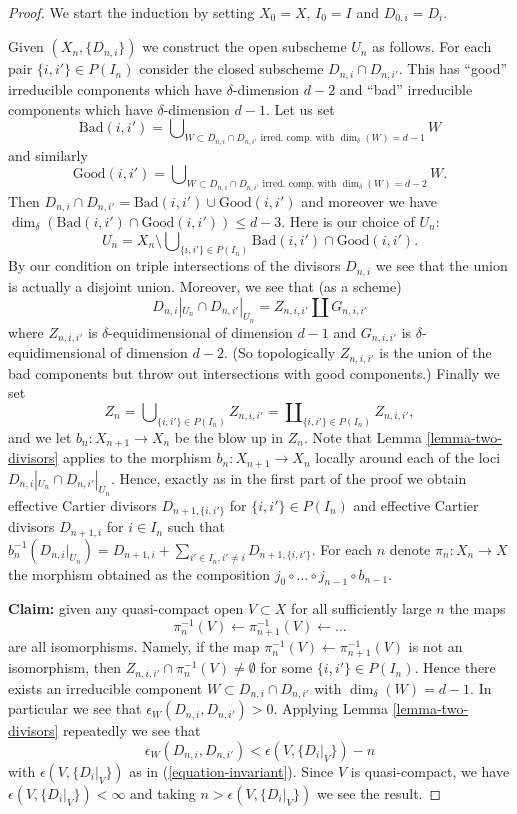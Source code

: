 \begin{proof}
\medskip\noindent
We start the induction by setting $X_0 = X$,
$I_0 = I$ and $D_{0, i} = D_i$.

\medskip\noindent
Given $(X_n, \{D_{n, i}\})$ we construct the open subscheme
$U_n$ as follows. For each pair $\{i, i'\} \in P(I_n)$ consider
the closed subscheme $D_{n, i} \cap D_{n, i'}$. This has ``good''
irreducible components which have $\delta$-dimension $d - 2$ and
``bad'' irreducible components which have $\delta$-dimension $d - 1$.
Let us set
$$
\text{Bad}(i, i')
=
\bigcup\nolimits_{W \subset D_{n, i} \cap D_{n, i'}
\text{ irred.\ comp. with }\dim_\delta(W) = d - 1} W
$$
and similarly
$$
\text{Good}(i, i')
=
\bigcup\nolimits_{W \subset D_{n, i} \cap D_{n, i'}
\text{ irred.\ comp. with }\dim_\delta(W) = d - 2} W.
$$
Then $D_{n, i} \cap D_{n, i'} = \text{Bad}(i, i') \cup \text{Good}(i, i')$
and moreover we have
$\dim_\delta(\text{Bad}(i, i') \cap \text{Good}(i, i')) \leq d - 3$.
Here is our choice of $U_n$:
$$
U_n
=
X_n
\setminus
\bigcup\nolimits_{\{i, i'\} \in P(I_n)}
\text{Bad}(i, i') \cap \text{Good}(i, i').
$$
By our condition on triple intersections of the divisors $D_{n, i}$
we see that the union is actually a disjoint union. Moreover,
we see that (as a scheme)
$$
D_{n, i}|_{U_n} \cap D_{n, i'}|_{U_n}
=
Z_{n, i, i'} \amalg G_{n, i, i'}
$$
where $Z_{n, i, i'}$ is $\delta$-equidimensional of dimension $d - 1$
and $G_{n, i, i'}$ is $\delta$-equidimensional of dimension $d - 2$.
(So topologically $Z_{n, i, i'}$ is the union of the bad components
but throw out intersections with good components.) Finally we set
$$
Z_n =
\bigcup\nolimits_{\{i, i'\} \in P(I_n)} Z_{n, i, i'} =
\coprod\nolimits_{\{i, i'\} \in P(I_n)} Z_{n, i, i'},
$$
and we let $b_n : X_{n + 1} \to X_n$ be the blow up in $Z_n$.
Note that Lemma \ref{lemma-two-divisors}
applies to the morphism $b_n : X_{n + 1} \to X_n$ locally around
each of the loci $D_{n, i}|_{U_n} \cap D_{n, i'}|_{U_n}$. Hence,
exactly as in the first part of the proof we obtain effective
Cartier divisors $D_{n + 1, \{i, i'\}}$ for $\{i, i'\} \in P(I_n)$
and effective Cartier divisors $D_{n + 1, i}$ for $i \in I_n$
such that
$b_n^{-1}(D_{n, i}|_{U_n}) = D_{n + 1, i} +
\sum\nolimits_{i' \in I_n, i' \not = i} D_{n + 1, \{i, i'\}}$.
For each $n$ denote $\pi_n : X_n \to X$ the morphism obtained
as the composition $j_0 \circ \ldots \circ j_{n - 1} \circ b_{n - 1}$.

\medskip\noindent
{\bf Claim:} given any quasi-compact open $V \subset X$
for all sufficiently large $n$ the maps
$$
\pi_n^{-1}(V) \leftarrow \pi_{n + 1}^{-1}(V) \leftarrow \ldots
$$
are all isomorphisms. Namely, if the map
$\pi_n^{-1}(V) \leftarrow \pi_{n + 1}^{-1}(V)$ is not an isomorphism,
then $Z_{n, i, i'} \cap \pi_n^{-1}(V) \not = \emptyset$ for some
$\{i, i'\} \in P(I_n)$. Hence there exists an irreducible component
$W \subset D_{n, i} \cap D_{n, i'}$ with $\dim_\delta(W) = d - 1$.
In particular we see that $\epsilon_W(D_{n, i}, D_{n, i'}) > 0$.
Applying Lemma \ref{lemma-two-divisors} repeatedly we see that
$$
\epsilon_W(D_{n, i}, D_{n, i'})
<
\epsilon(V, \{D_i|_V\}) - n
$$
with $\epsilon(V, \{D_i|_V\})$ as in (\ref{equation-invariant}).
Since $V$ is quasi-compact, we have
$\epsilon(V, \{D_i|_V\}) < \infty$ and taking $n > \epsilon(V, \{D_i|_V\})$
we see the result.


\end{proof}
